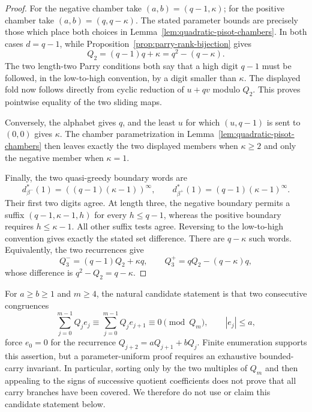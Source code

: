 \begin{proof}
For the negative chamber take $(a,b)=(q-1,\kappa)$; for the positive chamber
take $(a,b)=(q,q-\kappa)$.  The stated parameter bounds are precisely those
which place both choices in Lemma~\ref{lem:quadratic-pisot-chambers}.  In both
cases $d=q-1$, while Proposition~\ref{prop:parry-rank-bijection} gives
\[
Q_2=(q-1)q+\kappa=q^2-(q-\kappa).
\]
The two length-two Parry conditions both say that a high digit $q-1$ must be
followed, in the low-to-high convention, by a digit smaller than $\kappa$.
The displayed fold now follows directly from cyclic reduction of
$u+qv$ modulo $Q_2$.  This proves pointwise equality of the two sliding maps.

Conversely, the alphabet gives $q$, and the least $u$ for which
$(u,q-1)$ is sent to $(0,0)$ gives $\kappa$.  The chamber parametrization in
Lemma~\ref{lem:quadratic-pisot-chambers} then leaves exactly the two displayed
members when $\kappa\ge2$ and only the negative member when $\kappa=1$.

Finally, the two quasi-greedy boundary words are
\[
d_{\beta^-}^*(1)=((q-1)(\kappa-1))^\infty,
\qquad
d_{\beta^+}^*(1)=(q-1)(\kappa-1)^\infty.
\]
Their first two digits agree.  At length three, the negative boundary permits
a suffix $(q-1,\kappa-1,h)$ for every $h\le q-1$, whereas the positive
boundary requires $h\le\kappa-1$.  All other suffix tests agree.  Reversing
to the low-to-high convention gives exactly the stated set difference.
There are $q-\kappa$ such words.  Equivalently, the two recurrences give
\[
Q_3^-=(q-1)Q_2+\kappa q,\qquad
Q_3^+=qQ_2-(q-\kappa)q,
\]
whose difference is $q^2-Q_2=q-\kappa$.
\end{proof}

\begin{remark}
\label{rem:negative-two-window-open-interface}
For $a\ge b\ge1$ and $m\ge4$, the natural candidate statement is that two
consecutive congruences
\[
\sum_{j=0}^{m-1}Q_je_j\equiv
\sum_{j=0}^{m-1}Q_je_{j+1}\equiv0\pmod{Q_m},
\qquad |e_j|\le a,
\]
force $e_0=0$ for the recurrence
$Q_{j+2}=aQ_{j+1}+bQ_j$.  Finite enumeration supports this assertion, but a
parameter-uniform proof requires an exhaustive bounded-carry invariant.  In
particular, sorting only by the two multiples of $Q_m$ and then appealing to
the signs of successive quotient coefficients does not prove that all carry
branches have been covered.  We therefore do not use or claim this candidate
statement below.
\end{remark}


